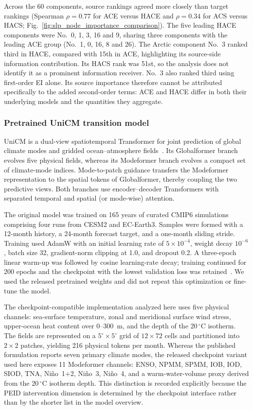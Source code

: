 \documentclass[fleqn,10pt]{wlscirep}
\begin{document}
Across the 60 components, source rankings agreed more closely than target rankings (Spearman \(\rho=0.77\) for ACE versus HACE and \(\rho=0.34\) for ACS versus HACS; Fig.~\ref{fig:slp_node_importance_comparison}). The five leading HACE components were No.~0, 1, 3, 16 and 9, sharing three components with the leading ACE group (No.~1, 0, 16, 8 and 26). The Arctic component No.~3 ranked third in HACE, compared with 15th in ACE, highlighting its source-side information contribution. Its HACS rank was 51st, so the analysis does not identify it as a prominent information receiver. No.~3 also ranked third using first-order EI alone. Its source importance therefore cannot be attributed specifically to the added second-order terms: ACE and HACE differ in both their underlying models and the quantities they aggregate.

\subsubsection{Pretrained UniCM transition model}
\label{app:unicm_model}

UniCM is a dual-view spatiotemporal Transformer for joint prediction of global climate modes and gridded ocean--atmosphere fields~\cite{yuan2026learning}. Its Globalformer branch evolves five physical fields, whereas its Modeformer branch evolves a compact set of climate-mode indices. Mode-to-patch guidance transfers the Modeformer representation to the spatial tokens of Globalformer, thereby coupling the two predictive views. Both branches use encoder--decoder Transformers with separated temporal and spatial (or mode-wise) attention.\par The original model was trained on 165 years of curated CMIP6 simulations comprising four runs from CESM2 and EC-Earth3. Samples were formed with a 12-month history, a 24-month forecast target, and a one-month sliding stride. Training used AdamW with an initial learning rate of $5\times10^{-4}$, weight decay $10^{-6}$, batch size 32, gradient-norm clipping at 1.0, and dropout 0.2. A three-epoch linear warm-up was followed by cosine learning-rate decay; training continued for 200 epochs and the checkpoint with the lowest validation loss was retained~\cite{yuan2026learning}. We used the released pretrained weights and did not repeat this optimization or fine-tune the model.

The checkpoint-compatible implementation analyzed here uses five physical channels: sea-surface temperature, zonal and meridional surface wind stress, upper-ocean heat content over 0--300~m, and the depth of the $20\,^{\circ}\mathrm{C}$ isotherm. The fields are represented on a $5^{\circ}\times5^{\circ}$ grid of $12\times72$ cells and partitioned into $2\times2$ patches, yielding 216 physical tokens per month. Whereas the published formulation reports seven primary climate modes, the released checkpoint variant used here exposes 11 Modeformer channels: ENSO, NPMM, SPMM, IOB, IOD, SIOD, TNA, Ni\~no~1+2, Ni\~no~3, Ni\~no~4, and a warm-water-volume proxy derived from the $20\,^{\circ}\mathrm{C}$ isotherm depth. This distinction is recorded explicitly because the PEID intervention dimension is determined by the checkpoint interface rather than by the shorter list in the model overview.
\end{document}

